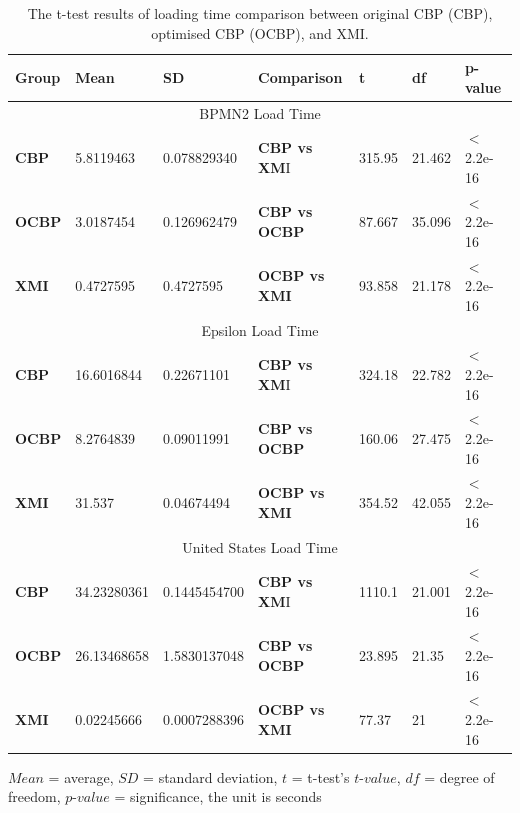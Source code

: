 \documentclass{llncs}
\begin{document}
 \vspace{-25pt}
 \begin{table}[ht]
     \footnotesize
     \centering
     \caption{The t-test results of loading time comparison between original CBP (CBP), optimised CBP (OCBP), and XMI.}
     \label{table:ttest_results_loadtime}
     \begin{tabular}
         {|p{}|p{}|p{}|p{}|p{}|p{}|p{}|}
         \hline 
         
         \textbf{Group} & \textbf{Mean} & \textbf{SD} & \textbf{Comparison} & \textbf{t}  & \textbf{df} & \textbf{p-value} \\  
         \hline 
         \multicolumn{7}{|c|}{BPMN2 Load Time} \\
         \hline 
         \textbf{CBP} & 5.8119463   & 0.078829340 & \textbf{CBP vs XM}I & 315.95    &21.462 & $<$ 2.2e-16 \\  
         \hline 
         \textbf{OCBP} & 3.0187454   & 0.126962479 & \textbf{CBP vs OCBP} & 87.667 & 35.096  & $<$ 2.2e-16 \\  
         \hline 
         \textbf{XMI} &0.4727595   & 0.4727595 & \textbf{OCBP vs XMI} & 93.858    & 21.178  & $<$ 2.2e-16 \\ 
         \hline 
         
         \multicolumn{7}{|c|}{Epsilon Load Time} \\
         \hline 
         \textbf{CBP} & 16.6016844    & 0.22671101 &  \textbf{CBP vs XM}I & 324.18   &22.782 & $<$ 2.2e-16 \\
         \hline 
         \textbf{OCBP} &  8.2764839  &  0.09011991 & \textbf{CBP vs OCBP} & 160.06 & 27.475 & $<$ 2.2e-16 \\  
         \hline 
         \textbf{XMI} & 31.537   & 0.04674494 & \textbf{OCBP vs XMI} & 354.52   &42.055  & $<$ 2.2e-16 \\ 
         \hline 
         
         \multicolumn{7}{|c|}{United States Load Time} \\
         \hline 
         \textbf{CBP} & 34.23280361     & 0.1445454700 & \textbf{CBP vs XM}I & 1110.1   &21.001 & $<$ 2.2e-16 \\ 
         \hline 
         \textbf{OCBP} & 26.13468658  &  1.5830137048 & \textbf{CBP vs OCBP} &  23.895 &21.35 & $<$ 2.2e-16 \\ 
         \hline 
         \textbf{XMI} &  0.02245666  & 0.0007288396 & \textbf{OCBP vs XMI} & 77.37   & 21 & $<$ 2.2e-16 \\ 
         \hline
     \end{tabular}
 \justify
 $Mean$ = average, $SD$ = standard deviation, $t$ = t-test's $t$-$value$, $df$ = degree of freedom, $p$-$value$ = significance, the unit is seconds
 \end{table}
\end{document}
